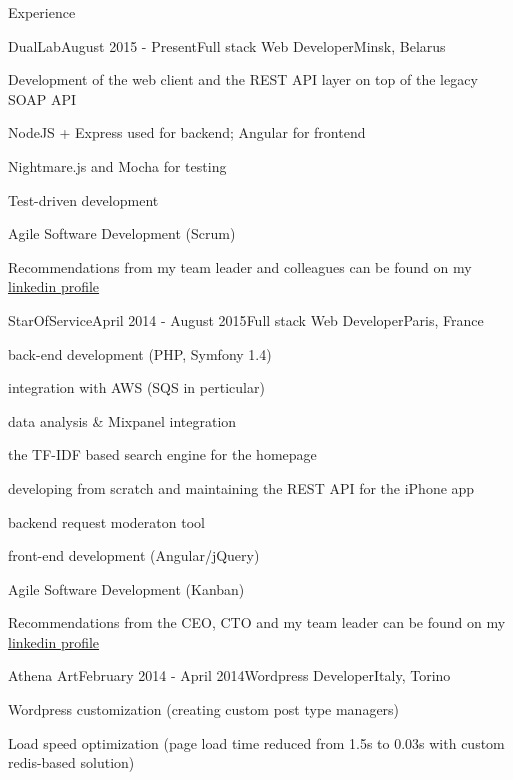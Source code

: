 \documentclass{resume} %
\begin{document}
\begin{rSection}{Experience}

\begin{rSubsection}{DualLab}{August 2015 - Present}{Full stack Web Developer}{Minsk, Belarus}
\item Development of the web client and the REST API layer on top of the legacy SOAP API
\item NodeJS + Express used for backend; Angular for frontend
\item Nightmare.js and Mocha for testing
\item Test-driven development
\item Agile Software Development (Scrum)
\item Recommendations from my team leader and colleagues can be found on my \href{https://www.linkedin.com/pub/alexander-mikhalchenko/84/70b/357}{linkedin profile}
\end{rSubsection}


\begin{rSubsection}{StarOfService}{April 2014 - August 2015}{Full stack Web Developer}{Paris, France}
\item back-end development (PHP, Symfony 1.4)
\item integration with AWS (SQS in perticular)
\item data analysis \& Mixpanel integration
\item the TF-IDF based search engine for the homepage
\item developing from scratch and maintaining the REST API for the iPhone app 
\item backend request moderaton tool
\item front-end development (Angular/jQuery)
\item Agile Software Development (Kanban)
\item Recommendations from the CEO, CTO and my team leader can be found on my \href{https://www.linkedin.com/pub/alexander-mikhalchenko/84/70b/357}{linkedin profile}
\end{rSubsection}


\begin{rSubsection}{Athena Art}{February 2014 - April 2014}{Wordpress Developer}{Italy, Torino}
\item Wordpress customization (creating custom post type managers)
\item Load speed optimization (page load time reduced from 1.5s to 0.03s with custom redis-based solution)
\end{rSubsection}


\end{rSection}
\end{document}
